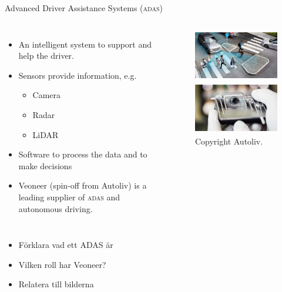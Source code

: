 \documentclass{beamer}
\newcommand{\adas}{\textsc{adas}\xspace}
\newcommand{\eg}{e.g.\xspace}
\renewcommand{\aa}{\"a\xspace}
\renewcommand{\o}{\"o\xspace}
\begin{document}
\begin{frame}{Advanced Driver Assistance Systems (\adas)}
	\begin{columns}
	\begin{itemize}
		\item An intelligent system to support and help the driver.
		\item Sensors provide information, \eg
		\begin{itemize}
			\item Camera
			\item Radar
			\item LiDAR
		\end{itemize}
		\item Software to process the data and to make decisions
		\item Veoneer (spin-off from Autoliv) is a leading supplier of \adas and autonomous driving.
	\end{itemize}
		\begin{figure}
			\includegraphics[height=2.25cm]{fig/ALV_People-crossing_Zebra-with-cars+detection_0}

			\vspace{0.5em}

			\includegraphics[height=2.25cm]{fig/ALV_Mono-Vision-Sensor}
			\caption{Copyright Autoliv.}
		\end{figure}
	\end{columns}

	\note
	{
		\begin{itemize}
			\item F\o{}rklara vad ett ADAS \aa{}r
			\item Vilken roll har Veoneer?
			\item Relatera till bilderna
		\end{itemize}
	}
\end{frame}
\end{document}
